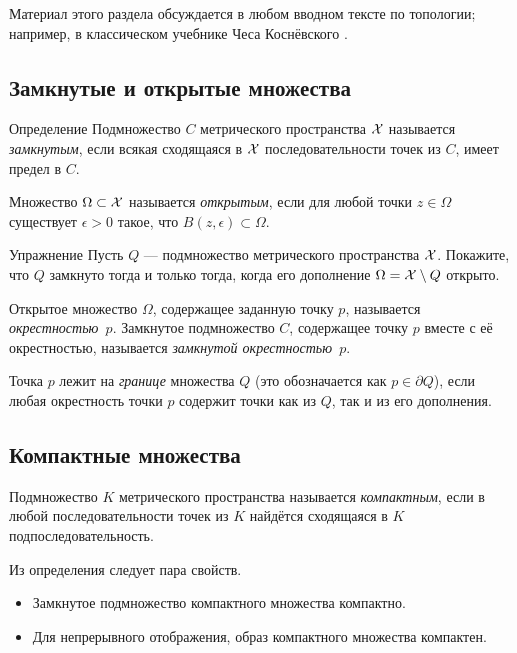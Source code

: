 Материал этого раздела обсуждается в любом вводном тексте по топологии;
например, в классическом учебнике Чеса Коснёвского \cite{kosniowski}.

\subsection*{Замкнутые и открытые множества}

\begin{thm}{Определение}
Подмножество $C$ метрического пространства $\mathcal{X}$ называется \emph{замкнутым}, если всякая сходящаяся в $\mathcal{X}$ последовательности точек из $C$, имеет предел в $C$.

Множество $\Omega \subset \mathcal{X}$ называется \emph{открытым}, если для любой точки $z\in \Omega$ 
существует $\epsilon>0$ такое, что $B(z,\epsilon)\subset\Omega$.
\end{thm}

\begin{thm}{Упражнение}\label{ex:close-open}
Пусть $Q$ --- подмножество метрического пространства $\mathcal{X}$.
Покажите, что $Q$ замкнуто тогда и только тогда, когда его дополнение $\Omega=\mathcal{X}\setminus Q$ открыто.
\end{thm}

Открытое множество $\Omega$, содержащее заданную точку $p$, называется \emph{окрестностью~$p$}.
Замкнутое подмножество $C$, содержащее точку $p$ вместе с её окрестностью, называется \emph{замкнутой окрестностью~$p$}.

Точка $p$ лежит на \emph{границе} множества $Q$ (это обозначается как $p\in\partial Q$), если любая окрестность точки $p$ содержит точки как из $Q$, так и из его дополнения.

\subsection*{Компактные множества}

{\sloppy
Подмножество $K$ метрического пространства называется \emph{компактным}, если в любой последовательности точек из $K$ найдётся сходящаяся в $K$ подпоследовательность.

}

Из определения следует пара свойств.

\begin{itemize}
\item Замкнутое подмножество компактного множества компактно.
\item Для непрерывного отображения, образ компактного множества компактен.
\end{itemize}


